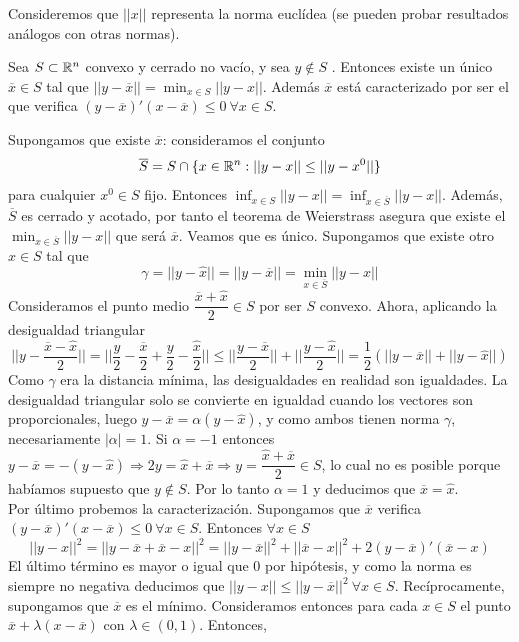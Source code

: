 \documentclass[PM.tex]{subfiles}
\begin{document}
Consideremos que $||x||$ representa la norma euclídea (se pueden probar resultados análogos con otras normas). 
\begin{theorem}
Sea $S\subset\mathbb{R}^n$ convexo y cerrado no vacío, y sea $y\not\in S$ . Entonces existe un único $\overline{x}\in S$ tal que $||y-\overline{x}||=\min_{x\in S}||y-x||$. Además $\overline{x}$ está caracterizado por ser el que verifica $(y-\overline{x})'(x-\overline{x})\leq 0\ \forall x\in S$.

\end{theorem}
\begin{dem}
Supongamos que existe $\overline{x}$: consideramos el conjunto \[ \overline{S}=S\cap\{x\in\mathbb{R}^n : ||y-x||\leq ||y-x^0||\}\] para cualquier $x^0\in S$ fijo. Entonces $\inf_{x\in S}||y-x||=\inf_{x\in\overline{S}}||y-x||$. Además, $\overline{S}$ es cerrado y acotado, por tanto el teorema de Weierstrass asegura que existe el $\min_{x\in\overline{S}}||y-x||$ que será $\overline{x}$. Veamos que es único. Supongamos que existe otro $\hat{x}\in S$ tal que 
\[
\gamma=||y-\hat{x}||=||y-\overline{x}||=\min_{x\in\overline{S}}||y-x||
\]
Consideramos el punto medio $\dfrac{\overline{x}+\hat{x}}{2}\in S$ por ser $S$ convexo. Ahora, aplicando la desigualdad triangular
\[
|| y-\frac{\overline{x}-\hat{x}}{2}||=||\frac{y}{2}-\frac{\overline{x}}{2}+\frac{y}{2}-\frac{\hat{x}}{2}||\leq ||\frac{y-\overline{x}}{2}||+||\frac{y-\hat{x}}{2}||=\frac{1}{2}\left(||y-\overline{x}||+||y-\hat{x}||\right)
\]
Como $\gamma$ era la distancia mínima, las desigualdades en realidad son igualdades. La desigualdad triangular solo se convierte en igualdad cuando los vectores son proporcionales, luego $y-\overline{x}=\alpha(y-\hat{x})$, y como ambos tienen norma $\gamma$, necesariamente $|\alpha|=1$. Si $\alpha=-1$ entonces $y-\overline{x}=-(y-\hat{x})\Rightarrow 2y=\hat{x}+\overline{x}\Rightarrow y=\dfrac{\hat{x}+\overline{x}}{2}\in S$, lo cual no es posible porque habíamos supuesto que $y\not\in S$. Por lo tanto $\alpha=1$ y deducimos que $\overline{x}=\hat{x}$.\\
Por último probemos la caracterización. Supongamos que $\overline{x}$ verifica $(y-\overline{x})'(x-\overline{x})\leq 0\ \forall x\in S$. Entonces $\forall x\in S$
\[
||y-x||^2=||y-\overline{x}+\overline{x}-x||^2=||y-\overline{x}||^2+||\overline{x}-x||^2+2(y-\overline{x})'(\overline{x}-x)
\]
El último término es mayor o igual que $0$ por hipótesis, y como la norma es siempre no negativa deducimos que $||y-x||\leq ||y-\overline{x}||^2\ \forall x\in S$. Recíprocamente, supongamos que $\overline{x}$ es el mínimo.  Consideramos entonces para cada $x\in S$ el punto $\overline{x}+\lambda(x-\overline{x})$ con $\lambda\in (0,1)$. Entonces, 

\end{dem}
\end{document}
